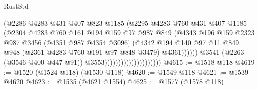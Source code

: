 \begin{lexlean}{RustStd}
\begin{coremodule}
                                                (@2286
                                                  @4283
                                                  @431
                                                  @407
                                                  @823
                                                  @1185
                                                  (@2295
                                                    @4283
                                                    @760
                                                    @431
                                                    @407
                                                    @1185
                                                    (@2304
                                                      @4283
                                                      @760
                                                      @161
                                                      @194
                                                      @159
                                                      @97
                                                      @987
                                                      @849
                                                      (@4343
                                                        @196
                                                        @159
                                                        @2323
                                                        @987
                                                        @3456
                                                        (@4351 @987 @4354 @3096)
                                                        (@4342
                                                          @194
                                                          @140
                                                          @97
                                                          @11
                                                          @849
                                                          @948
                                                          (@2361 @4283 @760 @191 @97 @848 @3479)
                                                          @4361))))))
                                              @3541
                                              (@2263 (@3546 @400 @447 @91))
                                              @3553)))))))))))))))))))))
@4615 := @1518 @118
@4619 := @1520 (@1524 @118) (@1530 @118)
@4620 := @1549 @118
@4621 := @1539 @4620
@4623 := @1535 (@4621 @1554)
@4625 := @1577 (@1578 @118)

\end{coremodule}
\end{lexlean}

